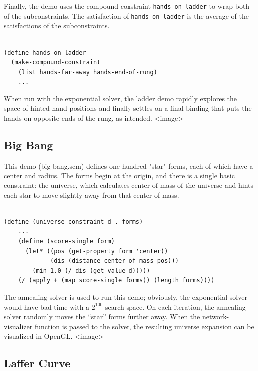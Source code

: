 \documentclass[12pt,a4paper]{article}
\begin{document}
Finally, the demo uses the compound constraint \texttt{hands-on-ladder} to wrap both of the subconstraints. The satisfaction of \texttt{hands-on-ladder} is the average of the satisfactions of the subconstraints.
\begin{lstlisting}

(define hands-on-ladder
  (make-compound-constraint
    (list hands-far-away hands-end-of-rung)
	...
\end{lstlisting}

When run with the exponential solver, the ladder demo rapidly explores the space of hinted hand positions and finally settles on a final binding that puts the hands on opposite ends of the rung, as intended.
<image>

\subsection{Big Bang}

This demo (big-bang.scm) defines one hundred "star" forms, each of which have a center and radius. The forms begin at the origin, and there is a single basic constraint: the universe, which calculates center of mass of the universe and hints each star to move slightly away from that center of mass. 
\begin{lstlisting}

(define (universe-constraint d . forms)
    ...
    (define (score-single form)
      (let* ((pos (get-property form 'center))
             (dis (distance center-of-mass pos)))
        (min 1.0 (/ dis (get-value d)))))
    (/ (apply + (map score-single forms)) (length forms))))
\end{lstlisting}

The annealing solver is used to run this demo; obviously, the exponential solver would have bad time with a $2^{100}$ search space. On each iteration, the annealing solver randomly moves the ``star'' forms further away. When the network-visualizer function is passed to the solver, the resulting universe expansion can be visualized in OpenGL.
<image>

\subsection{Laffer Curve}
\end{document}

